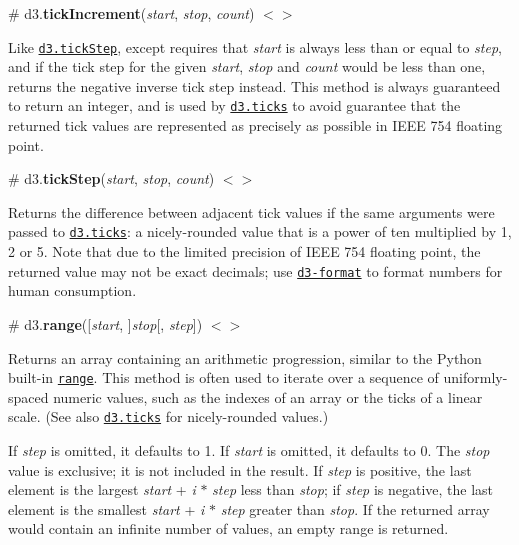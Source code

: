 \label{_tickIncrement}%
\# d3.{\bfseries tick\+Increment}({\itshape start}, {\itshape stop}, {\itshape count}) \href{https://github.com/d3/d3-array/blob/master/src/ticks.js#L16}{\tt $<$$>$}

Like \href{#tickStep}{\tt d3.\+tick\+Step}, except requires that {\itshape start} is always less than or equal to {\itshape step}, and if the tick step for the given {\itshape start}, {\itshape stop} and {\itshape count} would be less than one, returns the negative inverse tick step instead. This method is always guaranteed to return an integer, and is used by \href{#ticks}{\tt d3.\+ticks} to avoid guarantee that the returned tick values are represented as precisely as possible in I\+E\+EE 754 floating point.

\label{_tickStep}%
\# d3.{\bfseries tick\+Step}({\itshape start}, {\itshape stop}, {\itshape count}) \href{https://github.com/d3/d3-array/blob/master/src/ticks.js#L16}{\tt $<$$>$}

Returns the difference between adjacent tick values if the same arguments were passed to \href{#ticks}{\tt d3.\+ticks}\+: a nicely-\/rounded value that is a power of ten multiplied by 1, 2 or 5. Note that due to the limited precision of I\+E\+EE 754 floating point, the returned value may not be exact decimals; use \href{https://github.com/d3/d3-format}{\tt d3-\/format} to format numbers for human consumption.

\label{_range}%
\# d3.{\bfseries range}(\mbox{[}{\itshape start}, \mbox{]}{\itshape stop}\mbox{[}, {\itshape step}\mbox{]}) \href{https://github.com/d3/d3-array/blob/master/src/range.js}{\tt $<$$>$}

Returns an array containing an arithmetic progression, similar to the Python built-\/in \href{http://docs.python.org/library/functions.html#range}{\tt range}. This method is often used to iterate over a sequence of uniformly-\/spaced numeric values, such as the indexes of an array or the ticks of a linear scale. (See also \href{#ticks}{\tt d3.\+ticks} for nicely-\/rounded values.)

If {\itshape step} is omitted, it defaults to 1. If {\itshape start} is omitted, it defaults to 0. The {\itshape stop} value is exclusive; it is not included in the result. If {\itshape step} is positive, the last element is the largest {\itshape start} + {\itshape i} $\ast$ {\itshape step} less than {\itshape stop}; if {\itshape step} is negative, the last element is the smallest {\itshape start} + {\itshape i} $\ast$ {\itshape step} greater than {\itshape stop}. If the returned array would contain an infinite number of values, an empty range is returned.

